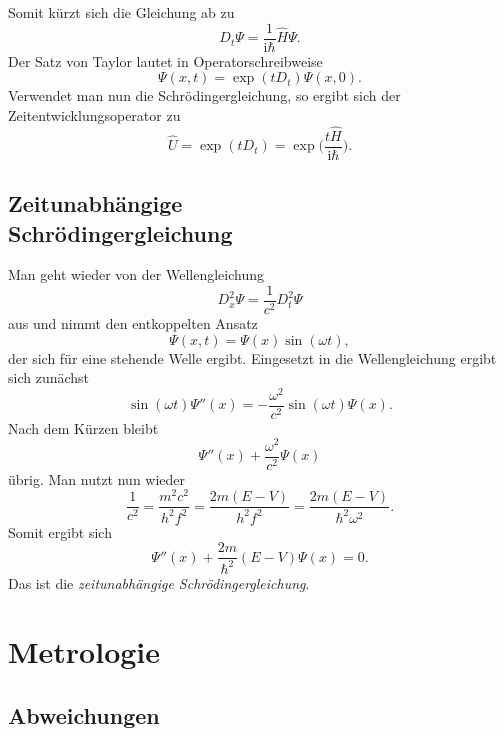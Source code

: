 \documentclass[a4paper,10pt,fleqn,twocolumn,twoside]{scrartcl}
\numberwithin{equation}{section}
\newcommand{\ui}{\mathrm i}
\begin{document}
Somit kürzt sich die Gleichung ab zu
\begin{equation}
D_t\Psi = \frac{1}{\ui\hbar}\hat H\Psi.
\end{equation}
Der Satz von Taylor lautet in Operatorschreibweise
\begin{equation}
\Psi(x,t)=\exp(tD_t)\Psi(x,0).
\end{equation}
Verwendet man nun die Schrödingergleichung, so ergibt sich
der Zeitentwicklungsoperator zu
\begin{equation}
\hat U = \exp(tD_t) = \exp\Big(\frac{t\hat H}{\ui\hbar}\Big).
\end{equation}

\subsection[Zeitunabhängige Schrödingergleichung]
{Zeitunabhängige\\
Schrödingergleichung}

Man geht wieder von der Wellengleichung
\begin{equation}
D_x^2\Psi=\frac{1}{c^2}D_t^2\Psi
\end{equation}
aus und nimmt den entkoppelten Ansatz
\begin{equation}
\Psi(x,t)=\Psi(x)\sin(\omega t),
\end{equation}
der sich für eine stehende Welle ergibt. Eingesetzt in
die Wellengleichung ergibt sich zunächst
\begin{equation}
\sin(\omega t)\Psi''(x)=-\frac{\omega^2}{c^2}\sin(\omega t)\Psi(x).
\end{equation}
Nach dem Kürzen bleibt
\begin{equation}
\Psi''(x) + \frac{\omega^2}{c^2}\Psi(x)
\end{equation}
übrig. Man nutzt nun wieder
\begin{equation}
\frac{1}{c^2} = \frac{m^2 c^2}{h^2 f^2}
= \frac{2m(E-V)}{h^2 f^2}
= \frac{2m(E-V)}{\hbar^2 \omega^2}.
\end{equation}
Somit ergibt sich
\begin{equation}
\Psi''(x) + \frac{2m}{\hbar^2}(E-V)\Psi(x) = 0.
\end{equation}
Das ist die \emph{zeitunabhängige Schrödingergleichung}.

\newpage
\section{Metrologie}
\subsection{Abweichungen}
\end{document}
